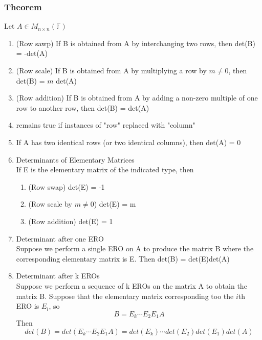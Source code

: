 \documentclass[12pt, letterpaper]{article}
\begin{document}
\subsubsection*{Theorem}
Let $A\in M_{n\times n}(\mathbb{F})$
\begin{enumerate}
    \item (Row sawp) If B is obtained from A by interchanging two rows, then det(B) = -det(A)
    \item (Row scale) If B is obtained from A by multiplying a row by $m\neq0$, then det(B) = $m$ det(A)
    \item (Row addition) If B is obtained from A by adding a non-zero multiple of one row to another row, then det(B) = det(A)
    \item[] remains true if instances of "row" replaced with "column"
    \item If A has two identical rows (or two identical columns), then det(A) = 0
    \item Determinants of Elementary Matrices \\
          If E is the elementary matrix of the indicated type, then 
          \begin{enumerate}
            \item (Row swap) det(E) = -1
            \item (Row scale by $m\neq0$) det(E) = m 
            \item (Row addition) det(E) = 1
          \end{enumerate}
    \item Determinant after one ERO \\
          Suppose we perform a single ERO on A to produce the matrix B where the corresponding elementary matrix is E. Then det(B) = det(E)det(A)
    \item Determinant after k EROs \\
          Suppose we perform a sequence of k EROs on the matrix A to obtain the matrix B. Suppose that the elementary matrix corresponding too the $i$th ERO is $E_i$, so 
          \[B = E_k\cdots E_2E_1A\]
          Then 
          \[det(B) = det(E_k\cdots E_2E_1A) = det(E_k)\cdots det(E_2)det(E_1)det(A)\]
\end{enumerate}
\end{document}
